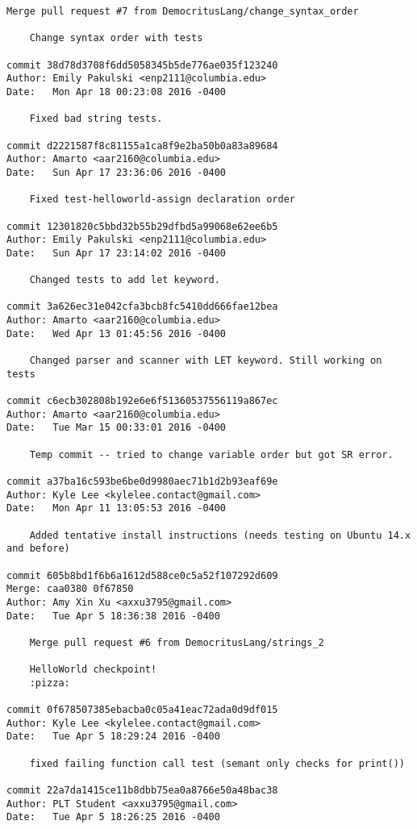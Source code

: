 \begin{lstlisting}[backgroundcolor=\color{white}]
    Merge pull request #7 from DemocritusLang/change_syntax_order
    
    Change syntax order with tests

commit 38d78d3708f6dd5058345b5de776ae035f123240
Author: Emily Pakulski <enp2111@columbia.edu>
Date:   Mon Apr 18 00:23:08 2016 -0400

    Fixed bad string tests.

commit d2221587f8c81155a1ca8f9e2ba50b0a83a89684
Author: Amarto <aar2160@columbia.edu>
Date:   Sun Apr 17 23:36:06 2016 -0400

    Fixed test-helloworld-assign declaration order

commit 12301820c5bbd32b55b29dfbd5a99068e62ee6b5
Author: Emily Pakulski <enp2111@columbia.edu>
Date:   Sun Apr 17 23:14:02 2016 -0400

    Changed tests to add let keyword.

commit 3a626ec31e042cfa3bcb8fc5410dd666fae12bea
Author: Amarto <aar2160@columbia.edu>
Date:   Wed Apr 13 01:45:56 2016 -0400

    Changed parser and scanner with LET keyword. Still working on tests

commit c6ecb302808b192e6e6f51360537556119a867ec
Author: Amarto <aar2160@columbia.edu>
Date:   Tue Mar 15 00:33:01 2016 -0400

    Temp commit -- tried to change variable order but got SR error.

commit a37ba16c593be6be0d9980aec71b1d2b93eaf69e
Author: Kyle Lee <kylelee.contact@gmail.com>
Date:   Mon Apr 11 13:05:53 2016 -0400

    Added tentative install instructions (needs testing on Ubuntu 14.x and before)

commit 605b8bd1f6b6a1612d588ce0c5a52f107292d609
Merge: caa0380 0f67850
Author: Amy Xin Xu <axxu3795@gmail.com>
Date:   Tue Apr 5 18:36:38 2016 -0400

    Merge pull request #6 from DemocritusLang/strings_2
    
    HelloWorld checkpoint!
    :pizza:

commit 0f678507385ebacba0c05a41eac72ada0d9df015
Author: Kyle Lee <kylelee.contact@gmail.com>
Date:   Tue Apr 5 18:29:24 2016 -0400

    fixed failing function call test (semant only checks for print())

commit 22a7da1415ce11b8dbb75ea0a8766e50a48bac38
Author: PLT Student <axxu3795@gmail.com>
Date:   Tue Apr 5 18:26:25 2016 -0400


\end{lstlisting}
